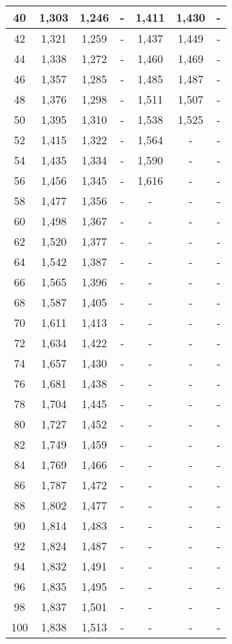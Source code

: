 \begin{longtable}[H]{|c|c|c|c|c|c|c|}
\hline 40 & 1,303 & 1,246 & - & 1,411 & 1,430 & -\\
\hline 42 & 1,321 & 1,259 & - & 1,437 & 1,449 & -\\
\hline 44 & 1,338 & 1,272 & - & 1,460 & 1,469 & -\\
\hline 46 & 1,357 & 1,285 & - & 1,485 & 1,487 & -\\
\hline 48 & 1,376 & 1,298 & - & 1,511 & 1,507 & -\\
\hline 50 & 1,395 & 1,310 & - & 1,538 & 1,525 & -\\
\hline 52 & 1,415 & 1,322 & - & 1,564 & - & -\\
\hline 54 & 1,435 & 1,334 & - & 1,590 & - & -\\
\hline 56 & 1,456 & 1,345 & - & 1,616 & - & -\\
\hline 58 & 1,477 & 1,356 & - & - & - & -\\
\hline 60 & 1,498 & 1,367 & - & - & - & -\\
\hline 62 & 1,520 & 1,377 & - & - & - & -\\
\hline 64 & 1,542 & 1,387 & - & - & - & -\\
\hline 66 & 1,565 & 1,396 & - & - & - & -\\
\hline 68 & 1,587 & 1,405 & - & - & - & -\\
\hline 70 & 1,611 & 1,413 & - & - & - & -\\
\hline 72 & 1,634 & 1,422 & - & - & - & -\\
\hline 74 & 1,657 & 1,430 & - & - & - & -\\
\hline 76 & 1,681 & 1,438 & - & - & - & -\\
\hline 78 & 1,704 & 1,445 & - & - & - & -\\
\hline 80 & 1,727 & 1,452 & - & - & - & -\\
\hline 82 & 1,749 & 1,459 & - & - & - & -\\
\hline 84 & 1,769 & 1,466 & - & - & - & -\\
\hline 86 & 1,787 & 1,472 & - & - & - & -\\
\hline 88 & 1,802 & 1,477 & - & - & - & -\\
\hline 90 & 1,814 & 1,483 & - & - & - & -\\
\hline 92 & 1,824 & 1,487 & - & - & - & -\\
\hline 94 & 1,832 & 1,491 & - & - & - & -\\
\hline 96 & 1,835 & 1,495 & - & - & - & -\\
\hline 98 & 1,837 & 1,501 & - & - & - & -\\
\hline 100 & 1,838 & 1,513 & - & - & - & -\\
\hline
\end{longtable}

